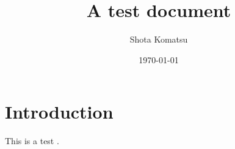 \documentclass{article}
\title{A test document}
\author{Shota Komatsu}
\date{\today}
\begin{document}
\maketitle

\section{Introduction}

This is a test \citep{knittel2018working}.



\end{document}
